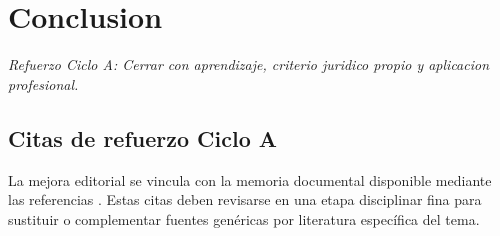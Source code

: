 \documentclass[12pt,letterpaper,oneside]{article}
\begin{document}

\section{Conclusion}
\textit{Refuerzo Ciclo A: Cerrar con aprendizaje, criterio juridico propio y aplicacion profesional.}

\clearpage
\nocite{unadmSitioWeb,unadmMallaDerecho2024}



\subsection*{Citas de refuerzo Ciclo A}
La mejora editorial se vincula con la memoria documental disponible mediante las referencias \citep{unadmSitioWeb,unadmMallaDerecho2024,cicloARefuerzo03,cicloARefuerzo04,cicloARefuerzo05}. Estas citas deben revisarse en una etapa disciplinar fina para sustituir o complementar fuentes genéricas por literatura específica del tema.
\end{document}
